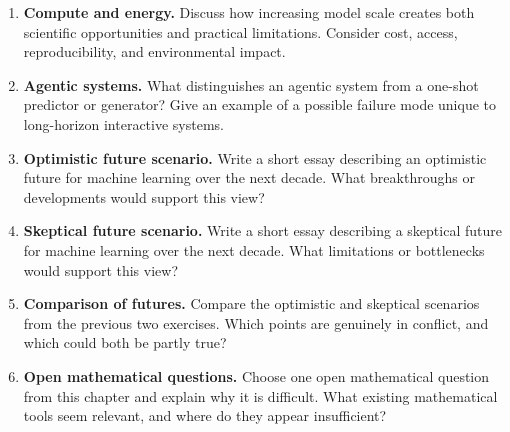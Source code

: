 \begin{enumerate}
    \item \textbf{Compute and energy.}
    Discuss how increasing model scale creates both scientific opportunities and practical limitations. Consider cost, access, reproducibility, and environmental impact.

    \item \textbf{Agentic systems.}
    What distinguishes an agentic system from a one-shot predictor or generator? Give an example of a possible failure mode unique to long-horizon interactive systems.

    \item \textbf{Optimistic future scenario.}
    Write a short essay describing an optimistic future for machine learning over the next decade. What breakthroughs or developments would support this view?

    \item \textbf{Skeptical future scenario.}
    Write a short essay describing a skeptical future for machine learning over the next decade. What limitations or bottlenecks would support this view?

    \item \textbf{Comparison of futures.}
    Compare the optimistic and skeptical scenarios from the previous two exercises. Which points are genuinely in conflict, and which could both be partly true?

    \item \textbf{Open mathematical questions.}
    Choose one open mathematical question from this chapter and explain why it is difficult. What existing mathematical tools seem relevant, and where do they appear insufficient?
\end{enumerate}
